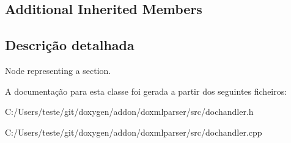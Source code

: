 \subsection*{Additional Inherited Members}


\subsection{Descrição detalhada}
Node representing a section. 



A documentação para esta classe foi gerada a partir dos seguintes ficheiros\-:\begin{DoxyCompactItemize}
\item 
C\-:/\-Users/teste/git/doxygen/addon/doxmlparser/src/dochandler.\-h\item 
C\-:/\-Users/teste/git/doxygen/addon/doxmlparser/src/dochandler.\-cpp\end{DoxyCompactItemize}
